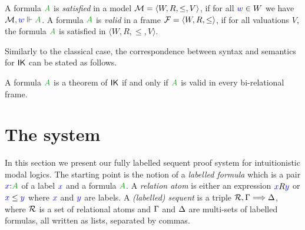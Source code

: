 \documentclass[a4paper]{article}
\begin{document}
 
 
 \begin{definition}
 	A formula $\fm A$ is \emph{satisfied} in a model $\mathcal{M} = \langle W, R, \le, V \rangle$, if for all ${\color{blue}{w}} \in W$ we have $\M, \lb w \Vdash \fm A$.
 	A formula $\fm A$ is \emph{valid} in a frame $\mathcal{F} = \langle W, R, \le \rangle$, if for all valuations $V$, the formula $\fm A$ is satisfied in $\langle W, R, \le, V \rangle$.
 \end{definition}
 
 Similarly to the classical case, the correspondence between syntax and semantics for $\mathsf{IK}$ can be stated as follows.
 
 \begin{theorem}\label{thm:plotkin}
 	A formula $\fm A$ is a theorem of $\mathsf{IK}$ if and only if $\fm A$ is valid in every bi-relational frame.
 \end{theorem}
 \section{The system}\label{sec:system}
 
 In this section we present our fully labelled sequent proof system
 for intuitionistic modal logics. The starting point is the notion of a
 \emph{labelled formula} which is a pair $\labels xA$ of a label ${\color{blue}{x}}$ and a formula $\fm A$. 
 A \emph{relation atom} is either an expression
 ${\color{blue}{x}}R{\color{blue}{y}}$ or ${\color{blue}{x}}\le{{\color{blue}{y}}}$ where ${\color{blue}{x}}$ and ${\color{blue}{y}}$ are labels. 
 A \emph{(labelled) sequent} is a triple $\mathcal{R} , \Gamma \Longrightarrow \Delta$,
 where $\mathcal{R}$ is a set of relational atoms and $\Gamma$ and $\Delta$ are multi-sets of labelled formulas, all written as lists, separated by commas.
 
\end{document}

